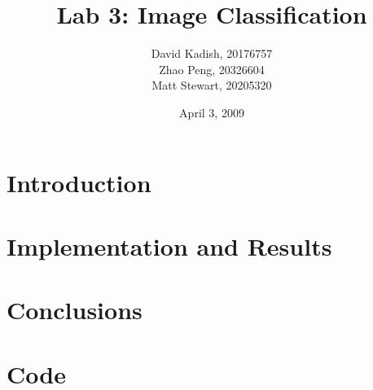 \documentclass{sydeStyle}
\title{Lab 3: Image Classification}
\author{
    David Kadish, 20176757\\
    Zhao Peng, 20326604\\
    Matt Stewart, 20205320\\
}
\date{April 3, 2009}
\numberwithin{algorithm}{chapter}
\begin{document}

\maketitle

\setcounter{page}{2} %


\chapter{Introduction}


\chapter{Implementation and Results}


\chapter{Conclusions}


\appendix
\renewcommand{\thechapter}{\Alph{chapter}}

\chapter{Code}

\end{document}
